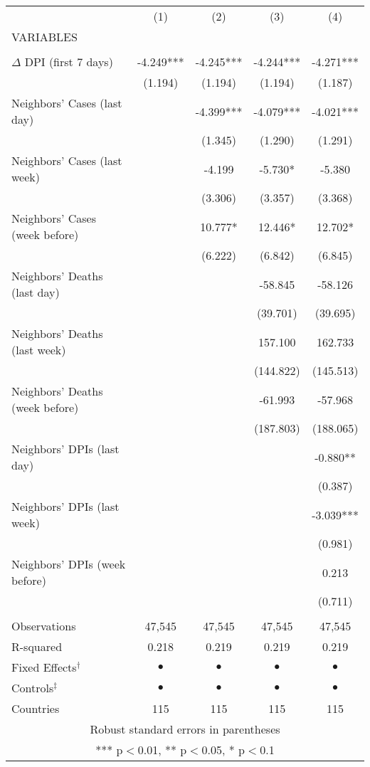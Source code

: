 \begin{tabular}{lcccc} \hline
 & (1) & (2) & (3) & (4) \\
VARIABLES &  &  &  &  \\ \hline
 &  &  &  &  \\
$\Delta$ DPI (first 7 days) & -4.249*** & -4.245*** & -4.244*** & -4.271*** \\
 & (1.194) & (1.194) & (1.194) & (1.187) \\
Neighbors' Cases (last day) &  & -4.399*** & -4.079*** & -4.021*** \\
 &  & (1.345) & (1.290) & (1.291) \\
Neighbors' Cases (last week) &  & -4.199 & -5.730* & -5.380 \\
 &  & (3.306) & (3.357) & (3.368) \\
Neighbors' Cases (week before) &  & 10.777* & 12.446* & 12.702* \\
 &  & (6.222) & (6.842) & (6.845) \\
Neighbors' Deaths (last day) &  &  & -58.845 & -58.126 \\
 &  &  & (39.701) & (39.695) \\
Neighbors' Deaths (last week) &  &  & 157.100 & 162.733 \\
 &  &  & (144.822) & (145.513) \\
Neighbors' Deaths (week before) &  &  & -61.993 & -57.968 \\
 &  &  & (187.803) & (188.065) \\
Neighbors' DPIs (last day) &  &  &  & -0.880** \\
 &  &  &  & (0.387) \\
Neighbors' DPIs (last week) &  &  &  & -3.039*** \\
 &  &  &  & (0.981) \\
Neighbors' DPIs (week before) &  &  &  & 0.213 \\
 &  &  &  & (0.711) \\
 &  &  &  &  \\
Observations & 47,545 & 47,545 & 47,545 & 47,545 \\
R-squared & 0.218 & 0.219 & 0.219 & 0.219 \\
Fixed Effects$^\dag$ & $ \bullet $ & $ \bullet $ & $ \bullet $ & $ \bullet $ \\
Controls$^\ddag$ & $ \bullet $ & $ \bullet $ & $ \bullet $ & $ \bullet $ \\
 Countries & 115 & 115 & 115 & 115 \\ \hline
\multicolumn{5}{c}{ Robust standard errors in parentheses} \\
\multicolumn{5}{c}{ *** p$<$0.01, ** p$<$0.05, * p$<$0.1} \\
\end{tabular}

